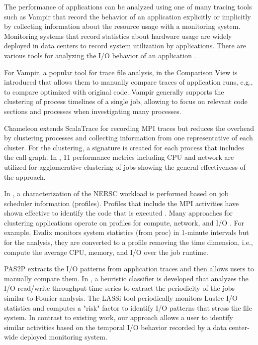 \documentclass{jhps}
\begin{document}

The performance of applications can be analyzed using one of many tracing tools such as Vampir \cite{weber2017visual} that record the behavior of an application explicitly or implicitly by collecting information about the resource usage with a monitoring system.
Monitoring systems that record statistics about hardware usage are widely deployed in data centers to record system utilization by applications.
There are various tools for analyzing the I/O behavior of an application \cite{TFAPIKBBCF19}.

For Vampir, a popular tool for trace file analysis, in \cite{weber2017visual} the Comparison View is introduced that allows them to manually compare traces of application runs, e.g., to compare optimized with original code.
Vampir generally supports the clustering of process timelines of a single job, allowing to focus on relevant code sections and processes when investigating many processes.

Chameleon \cite{bahmani2018chameleon} extends ScalaTrace for recording MPI traces but reduces the overhead by clustering processes and collecting information from one representative of each cluster.
For the clustering, a signature is created for each process that includes the call-graph.
In \cite{halawa2020unsupervised}, 11 performance metrics including CPU and network are utilized for agglomerative clustering of jobs showing the general effectiveness of the approach.

In \cite{rodrigo2018towards}, a characterization of the NERSC workload is performed based on job scheduler information (profiles).
Profiles that include the MPI activities have shown effective to identify the code that is executed \cite{demasi2013identifying}.
Many approaches for clustering applications operate on profiles for compute, network, and I/O \cite{emeras2015evalix,liu2020characterization,bang2020hpc}.
For example, Evalix \cite{emeras2015evalix} monitors system statistics (from proc) in 1-minute intervals but for the analysis, they are converted to a profile removing the time dimension, i.e., compute the average CPU, memory, and I/O over the job runtime.

PAS2P \cite{mendez2012new} extracts the I/O patterns from application traces and then allows users to manually compare them.
In \cite{white2018automatic}, a heuristic classifier is developed that analyzes the I/O read/write throughput time series to extract the periodicity of the jobs -- similar to Fourier analysis.
The LASSi tool \cite{AOPIUOTUNS19} periodically monitors Lustre I/O statistics and computes a "risk" factor to identify I/O patterns that stress the file system.
In contrast to existing work, our approach allows a user to identify similar activities based on the temporal I/O behavior recorded by a data center-wide deployed monitoring system.
\end{document}
